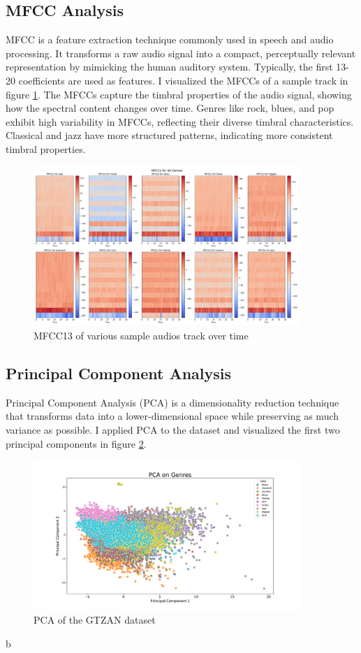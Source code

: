 \documentclass[11.5pt]{article}
\begin{document}
\subsection{MFCC Analysis}
MFCC is a feature extraction technique commonly used in speech and audio processing. It transforms a raw audio signal into a compact, perceptually relevant representation by mimicking the human auditory system. Typically, the first 13-20 coefficients are used as features. I visualized the MFCCs of a sample track in figure \ref{fig:mfcc}. The MFCCs capture the timbral properties of the audio signal, showing how the spectral content changes over time. Genres like rock, blues, and pop exhibit high variability in MFCCs, reflecting their diverse timbral characteristics. Classical and jazz have more structured patterns, indicating more consistent timbral properties.
\begin{figure}[h]
    \centering
    \includegraphics[width=0.9\textwidth]{graphics/mfccs.pdf}
    \caption{MFCC13 of various sample audios track over time}
    \label{fig:mfcc}
\end{figure}

\subsection{Principal Component Analysis}
Principal Component Analysis (PCA) is a dimensionality reduction technique that transforms data into a lower-dimensional space while preserving as much variance as possible. I applied PCA to the dataset and visualized the first two principal components in figure \ref{fig:pca}.
\begin{figure}[H]
    \centering
    \includegraphics[width=0.9\textwidth]{graphics/pca.pdf}
    \caption{PCA of the GTZAN dataset}
    \label{fig:pca}
\end{figure}
b
\end{document}
